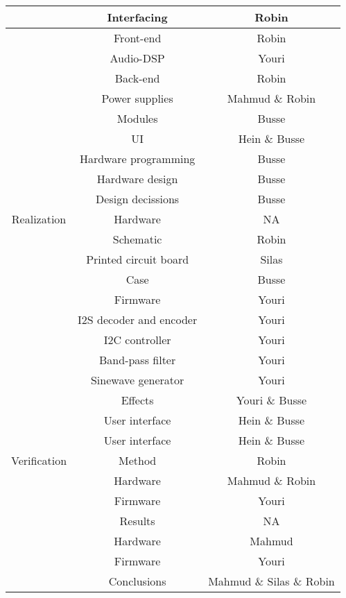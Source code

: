 \begin{justify}
\begin{longtable}{|c|c|c|}
								& Interfacing					& Robin						\\ \hline
								& Front-end						& Robin						\\ \hline
								& Audio-DSP						& Youri						\\ \hline
								& Back-end						& Robin						\\ \hline
								& Power supplies				& Mahmud \& Robin			\\ \hline
								& Modules						& Busse						\\ \hline
								& UI							& Hein \& Busse				\\ \hline
								& Hardware programming			& Busse						\\ \hline
								& Hardware design				& Busse						\\ \hline
								& Design decissions				& Busse						\\ \hline
	Realization					& Hardware						& NA						\\ \hline
								& Schematic						& Robin						\\ \hline
								& Printed circuit board			& Silas						\\ \hline
								& Case							& Busse						\\ \hline
								& Firmware						& Youri						\\ \hline
								& I2S decoder and encoder		& Youri						\\ \hline
								& I2C controller				& Youri						\\ \hline
								& Band-pass filter				& Youri						\\ \hline
								& Sinewave generator			& Youri						\\ \hline
								& Effects						& Youri \& Busse			\\ \hline
								& User interface				& Hein \& Busse				\\ \hline
								& User interface				& Hein \& Busse				\\ \hline
	Verification				& Method						& Robin						\\ \hline
								& Hardware						& Mahmud \& Robin			\\ \hline
								& Firmware						& Youri						\\ \hline
								& Results						& NA						\\ \hline
								& Hardware						& Mahmud					\\ \hline
								& Firmware						& Youri						\\ \hline
								& Conclusions					& Mahmud \& Silas \& Robin 	\\ \hline

\end{longtable}
\end{justify}
